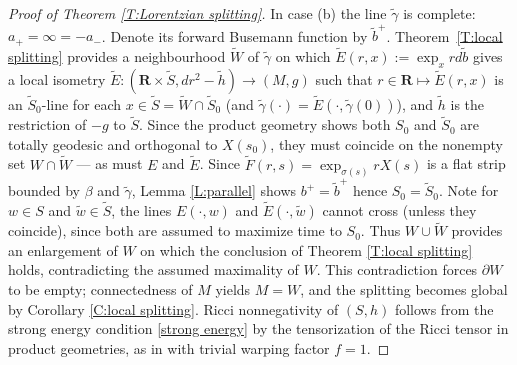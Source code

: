 \documentclass[12pt]{amsart}
\newcommand{\R}{{\mathbf R}}
\newcommand{\p}{{\partial}}
\begin{document}
\begin{proof}[Proof of Theorem \ref{T:Lorentzian splitting}]
In case (b) the line $\tilde \gamma$ is complete: $a_+=\infty=-a_-$.  
Denote its forward Busemann function by 
$\tilde b^+$.  Theorem~\ref{T:local splitting} provides a neighbourhood $\tilde W$ of $\tilde \gamma$
on which $\tilde E(r,x) := \exp_x r d\tilde b$ gives a local isometry $\tilde E:(\R \times \tilde S, dr^2 - \tilde h) \longrightarrow (M,g)$ such that
$r \in \R \mapsto \tilde E(r,x)$ is an $\tilde S_0$-line for each $x \in \tilde S=\tilde W \cap \tilde S_0$ (and $\tilde \gamma(\cdot)=\tilde E(\cdot,\tilde \gamma(0))$),
and $\tilde h$ is the restriction of $-g$ to $\tilde S$. Since the product geometry shows both $S_0$ and $\tilde S_0$ are totally geodesic and orthogonal to $X(s_0)$, they must coincide on the nonempty set $W \cap \tilde W$
--- as must $E$ and $\tilde E$.  Since
$\tilde F(r,s) = \exp_{\sigma(s)} r X(s)$
is a flat strip bounded by $\beta$ and $\tilde \gamma$,  Lemma
\ref{L:parallel} shows $b^+=\tilde b^+$
hence $S_0=\tilde S_0$.
Note for $w \in S$ and $\tilde w \in \tilde S$, the lines $E(\cdot,w)$ and $\tilde E(\cdot,\tilde w)$ cannot cross (unless they coincide), since both are assumed to maximize time to $S_0$. Thus
$W \cup \tilde W$ provides an enlargement of $W$ on which the conclusion of Theorem \ref{T:local splitting} holds, contradicting the assumed maximality of $W$.
This contradiction forces $\p W$ to be empty;
connectedness of $M$ yields $M=W$,
and the splitting becomes global by Corollary \ref{C:local splitting}.
  Ricci nonnegativity of $(S,h)$ follows from the strong energy condition \eqref{strong energy} by the tensorization of the Ricci tensor in 
product geometries, as in \cite[Corollary 7.43]{O'Neill83} with trivial warping factor $f=1$.


\end{proof}
\end{document}
